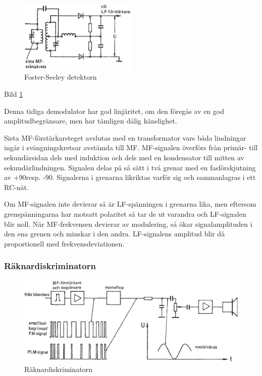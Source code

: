\begin{figure}
\includegraphics[width=0.5\textwidth]{images/cropped_pdfs/bild_2_3-60.pdf}
\caption{Foster-Seeley detektorn}
\label{fig:BildII3-60}
\end{figure}

Bild \ref{fig:BildII3-60}

Denna tidiga demodulator har god linjäritet, om den föregås av en god
amplitudbegränsare, men har tämligen dålig känslighet.

Sista MF-förstärkarsteget avslutas med en transformator vars båda
lindningar ingår i svängningskretsar avstämda till MF. MF-signalen
överförs från primär- till sekundärsidan dels med induktion och dels
med en kondensator till mitten av sekundärlindningen. Signalen delas på
så sätt i två grenar med en fasförskjutning av +90\degree resp. -90\degree.
Signalerna i grenarna likriktas varför sig och sammanlagras i ett
RC-nät.

Om MF-signalen inte devierar så är LF-spänningen i grenarna lika, men
eftersom grenspänningarna har motsatt polaritet så tar de ut varandra
och LF-signalen blir noll.  När MF-frekvensen devierar av modulering,
så ökar signalamplituden i den ena grenen och minskar i den
andra. LF-signalens amplitud blir då proportionell med
frekvensdeviationen.

\subsubsection{Räknardiskriminatorn}

\begin{figure}
\includegraphics[width=\textwidth]{images/cropped_pdfs/bild_2_3-61.pdf}
\caption{Räknardiskriminatorn}
\label{fig:BildII3-61}
\end{figure}

